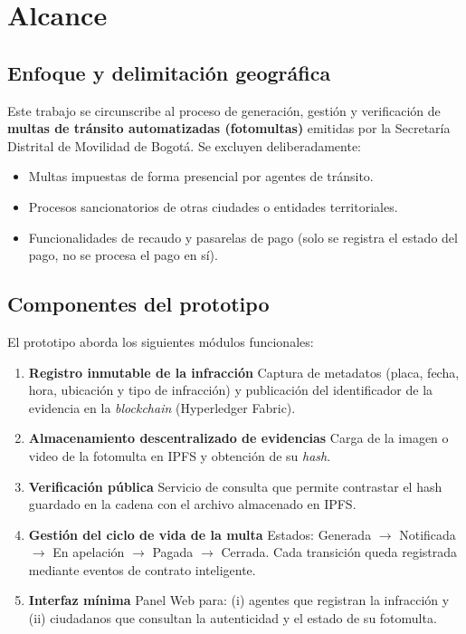\section{Alcance}

\subsection{Enfoque y delimitación geográfica}
Este trabajo se circunscribe al proceso de generación, gestión y verificación de \textbf{multas de tránsito automatizadas (fotomultas)} emitidas por la Secretaría Distrital de Movilidad de Bogotá.  Se excluyen deliberadamente:
\begin{itemize}
  \item Multas impuestas de forma presencial por agentes de tránsito.
  \item Procesos sancionatorios de otras ciudades o entidades territoriales.
  \item Funcionalidades de recaudo y pasarelas de pago (solo se registra el estado del pago, no se procesa el pago en sí).
\end{itemize}

\subsection{Componentes del prototipo}
El prototipo aborda los siguientes módulos funcionales:

\begin{enumerate}
  \item \textbf{Registro inmutable de la infracción}  
        Captura de metadatos (placa, fecha, hora, ubicación y tipo de infracción) y publicación del identificador de la evidencia en la \emph{blockchain} (Hyperledger Fabric).
  \item \textbf{Almacenamiento descentralizado de evidencias}  
        Carga de la imagen o video de la fotomulta en IPFS y obtención de su \emph{hash}.
  \item \textbf{Verificación pública}  
        Servicio de consulta que permite contrastar el hash guardado en la cadena con el archivo almacenado en IPFS.
  \item \textbf{Gestión del ciclo de vida de la multa}  
        Estados: \textsf{Generada} $\rightarrow$ \textsf{Notificada} $\rightarrow$ \textsf{En apelación} $\rightarrow$ \textsf{Pagada} $\rightarrow$ \textsf{Cerrada}.  
        Cada transición queda registrada mediante eventos de contrato inteligente.
  \item \textbf{Interfaz mínima}  
        Panel Web para: (i) agentes que registran la infracción y (ii) ciudadanos que consultan la autenticidad y el estado de su fotomulta.
\end{enumerate}

